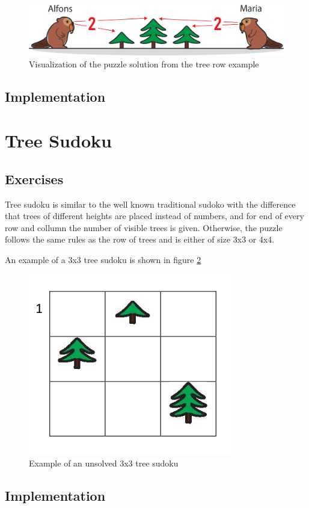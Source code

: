 \begin{figure} 
    \centering
    \includegraphics[width=0.8 \columnwidth]{figures/tree_row_example.png}
    \caption{Visualization of the puzzle solution from the tree row example} 
    \label{fig:tree_row_example} 
\end{figure}

\subsection{Implementation}

\section{Tree Sudoku}
\label{section:treeSudoku}

\subsection{Exercises}
Tree sudoku is similar to the well known traditional sudoko with the difference that trees of different heights are placed instead of numbers, and for end of every row and collumn the number of visible trees is given. Otherwise, the puzzle follows the same rules as the row of trees and is either of size 3x3 or 4x4.

\begin{example}
    An example of a 3x3 tree sudoku is shown in figure \ref{fig:tree_sudoku_example}
\end{example}

\begin{figure} 
    \centering
    \includegraphics[width=0.4 \columnwidth]{figures/tree_sudoku_example.png}
    \caption{Example of an unsolved 3x3 tree sudoku} 
    \label{fig:tree_sudoku_example} 
\end{figure}

\subsection{Implementation}
